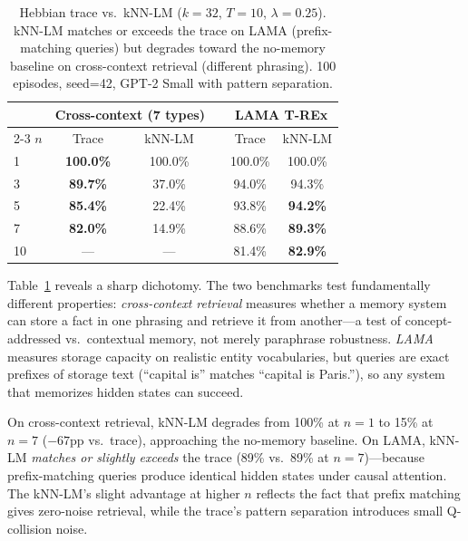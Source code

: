 \documentclass[11pt,a4paper]{article}
\begin{document}
\begin{table}[t]
  \centering
  \caption{Hebbian trace vs.\ kNN-LM ($k{=}32$, $T{=}10$, $\lambda{=}0.25$). kNN-LM matches or exceeds the trace on LAMA (prefix-matching queries) but degrades toward the no-memory baseline on cross-context retrieval (different phrasing). 100 episodes, seed=42, GPT-2 Small with pattern separation.}
  \label{tab:knn}
  \begin{tabular}{@{}lccccc@{}}
    \toprule
    & \multicolumn{2}{c}{Cross-context (7 types)} & & \multicolumn{2}{c}{LAMA T-REx} \\
    \cmidrule{2-3} \cmidrule{5-6}
    $n$ & Trace & kNN-LM & & Trace & kNN-LM \\
    \midrule
    1  & \textbf{100.0\%} & 100.0\%       & & 100.0\% & 100.0\%       \\
    3  & \textbf{89.7\%}  & 37.0\%        & & 94.0\%  & 94.3\%        \\
    5  & \textbf{85.4\%}  & 22.4\%        & & 93.8\%  & \textbf{94.2\%} \\
    7  & \textbf{82.0\%}  & 14.9\%        & & 88.6\%  & \textbf{89.3\%} \\
    10 & ---               & ---           & & 81.4\%  & \textbf{82.9\%} \\
    \bottomrule
  \end{tabular}
\end{table}

Table~\ref{tab:knn} reveals a sharp dichotomy. The two benchmarks test fundamentally different properties: \emph{cross-context retrieval} measures whether a memory system can store a fact in one phrasing and retrieve it from another---a test of concept-addressed vs.\ contextual memory, not merely paraphrase robustness. \emph{LAMA} measures storage capacity on realistic entity vocabularies, but queries are exact prefixes of storage text (``capital is'' matches ``capital is Paris.''), so any system that memorizes hidden states can succeed.

On cross-context retrieval, kNN-LM degrades from 100\% at $n{=}1$ to 15\% at $n{=}7$ ($-67$pp vs.\ trace), approaching the no-memory baseline. On LAMA, kNN-LM \emph{matches or slightly exceeds} the trace (89\% vs.\ 89\% at $n{=}7$)---because prefix-matching queries produce identical hidden states under causal attention. The kNN-LM's slight advantage at higher $n$ reflects the fact that prefix matching gives zero-noise retrieval, while the trace's pattern separation introduces small Q-collision noise.
\end{document}
